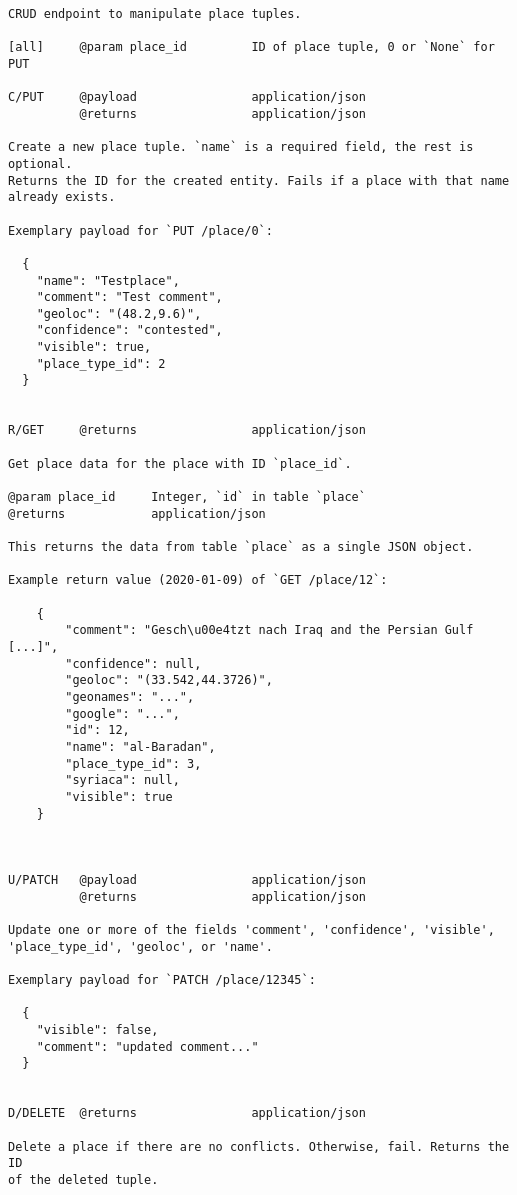 {\small\begin{verbatim}CRUD endpoint to manipulate place tuples.

[all]     @param place_id         ID of place tuple, 0 or `None` for PUT

C/PUT     @payload                application/json
          @returns                application/json

Create a new place tuple. `name` is a required field, the rest is optional.
Returns the ID for the created entity. Fails if a place with that name
already exists.

Exemplary payload for `PUT /place/0`:

  {
    "name": "Testplace",
    "comment": "Test comment",
    "geoloc": "(48.2,9.6)",
    "confidence": "contested",
    "visible": true,
    "place_type_id": 2
  }


R/GET     @returns                application/json

Get place data for the place with ID `place_id`.

@param place_id     Integer, `id` in table `place`
@returns            application/json

This returns the data from table `place` as a single JSON object.

Example return value (2020-01-09) of `GET /place/12`:

    {
        "comment": "Gesch\u00e4tzt nach Iraq and the Persian Gulf [...]",
        "confidence": null,
        "geoloc": "(33.542,44.3726)",
        "geonames": "...",
        "google": "...",
        "id": 12,
        "name": "al-Baradan",
        "place_type_id": 3,
        "syriaca": null,
        "visible": true
    }



U/PATCH   @payload                application/json
          @returns                application/json

Update one or more of the fields 'comment', 'confidence', 'visible',
'place_type_id', 'geoloc', or 'name'.

Exemplary payload for `PATCH /place/12345`:

  {
    "visible": false,
    "comment": "updated comment..."
  }


D/DELETE  @returns                application/json

Delete a place if there are no conflicts. Otherwise, fail. Returns the ID
of the deleted tuple.

\end{verbatim}}
